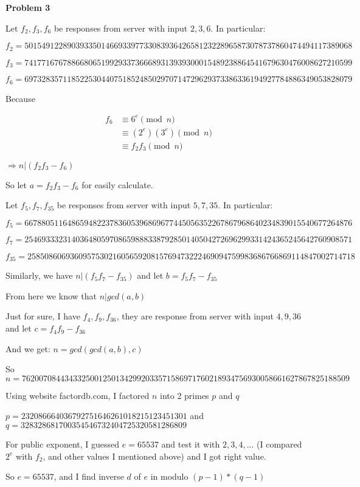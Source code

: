 \documentclass[letterpaper]{article}
\begin{document}
\textbf{Problem 3}

Let $f_2, f_3, f_6$ be responses from server with input $2,3,6$. In particular:

$f_2=50154912289039335014669339773308393642658123228965873078737860474494117389068$

$f_3=74177167678866806519929337366689313939300015489238864541679630476008627210599$

$f_6=69732835711852253044075185248502970714729629373386336194927784886349053828079$

Because

\begin{align*}
    f_6 & \equiv 6^e \pmod n \\
    & \equiv (2^e)(3^e) \pmod n \\
    & \equiv f_2 f_3 \pmod n
\end{align*}

$\Rightarrow n | (f_2f_3-f_6)$

So let $a=f_2f_3-f_6$ for easily calculate.

Let $f_5, f_7, f_{35}$ be responses from server with input $5,7,35$. In particular:

$f_5=66788051164865948223783605396869677445056352267867968640234839015540677264876$

$f_7=25469333231403648059708659888338792850140504272696299331424365245642760908571$

$f_{35}=25850860693609575302160565920815769473222469094759983686766869114847002714718$

Similarly, we have $n|(f_5f_7-f_{35})$ and let $b=f_5f_7-f_{35}$

From here we know that $n|gcd(a,b)$

Just for sure, I have $f_4, f_9, f_{36}$, they are response from server with input $4,9,36$ and let $c=f_4f_9-f_{36}$

And we get: $n=gcd(gcd(a,b), c)$

So $n=76200708443433250012501342992033571586971760218934756930058661627867825188509$

Using website factordb.com, I factored $n$ into 2 primes $p$ and $q$

$p=232086664036792751646261018215123451301$ and $q=328328681700354546732404725320581286809$

For public exponent, I guessed $e=65537$ and test it with $2,3,4,...$ (I compared $2^e$ with $f_2$, and other values I mentioned above) and I got right value.

So $e=65537$, and I find inverse $d$ of $e$ in modulo $(p-1)*(q-1)$
\end{document}
